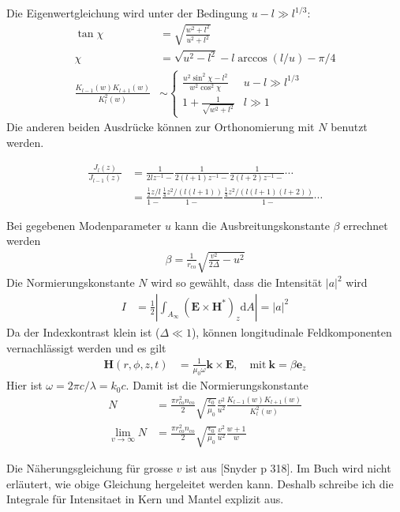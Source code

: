 \documentclass[DIV19,twocolumn]{scrartcl}
\newcommand{\vect}[1]{\mathbf{#1}}
\def\k{\vect k}
\def\e{\vect e}
\def\E{\vect E}
\def\H{\vect H}
\def\({\left(}
\def\){\right)}
\newcommand{\nco}{n_\textrm{co}}
\newcommand{\rco}{r_\textrm{co}}
\begin{document}
Die Eigenwertgleichung wird unter der Bedingung $u-l\gg l^{1/3}$:
\begin{align}
  \tan\chi &= \sqrt{\frac{w^2+l^2}{u^2+l^2}}\\
  \chi &= \sqrt{u^2-l^2}-l\arccos(l/u)-\pi/4\\
  \frac{K_{l-1}(w)K_{l+1}(w)}{K_l^2(w)} &\sim \begin{cases}
    \frac{u^2 \sin^2\chi - l^2}{w^2 \cos^2\chi}&  u-l\gg l^{1/3}\\
   1+\frac{1}{\sqrt{w^2+l^2}} & l\gg 1
\end{cases}
\end{align}
Die anderen beiden Ausdr\"ucke k\"onnen zur Orthonomierung mit $N$
benutzt werden.

\begin{align}
  \frac{J_l(z)}{J_{l-1}(z)} &= \frac{1}{2lz^{-1}-} \frac{1}{2(l+1)z^{-1}-} \frac{1}{2(l+2)z^{-1} -}\cdots \\
  &= \frac{\frac{1}{2}z/l}{1-} \frac{\frac{1}{4}z^2/(l(l+1))}{1-} \frac{\frac{1}{4}z^2/(l(l+1)(l+2))}{1-} \cdots
\end{align}


Bei gegebenen Modenparameter $u$ kann die Ausbreitungskonstante
$\beta$ errechnet werden
\begin{align}
\beta = \frac{1}{\rco} \sqrt{\frac{v^2}{2\Delta} - u^2}
\end{align}
Die Normierungskonstante $N$ wird so gew\"ahlt, dass die Intensit\"at
$|a|^2$ wird
\begin{align}
  I &= \frac{1}{2}\left|\int_{A_\infty}\!\!\!\!\! \(\E\times\H^*\)_z  \textrm{d}A \right| = |a|^2
\end{align}
Da der Indexkontrast klein ist ($\Delta \ll 1$), k\"onnen longitudinale Feldkomponenten vernachl\"assigt werden und es gilt
\begin{align}
  \H(r,\phi,z,t) &= \frac{1}{\mu_0 \omega} \k \times \E, \quad\textrm{mit}\ \k = \beta \e_z
\end{align}
Hier ist $\omega=2\pi c/\lambda=k_0c$.
Damit ist die Normierungskonstante 
\begin{align}
  N &= \frac{\pi \rco^2 \nco}{2} \sqrt{\frac{\epsilon_0}{\mu_0}} \frac{v^2}{u^2} \frac{K_{l-1}(w)K_{l+1}(w)}{K_l^2(w)}\\
  \lim_{v\rightarrow\infty} N &= \frac{\pi \rco^2 \nco}{2} \sqrt{\frac{\epsilon_0}{\mu_0}} \frac{v^2}{u^2} \frac{w+1}{w}
\end{align}

Die N\"aherungsgleichung f\"ur grosse $v$ ist aus [Snyder p 318]. Im
Buch wird nicht erl\"autert, wie obige Gleichung hergeleitet werden
kann. Deshalb schreibe ich die Integrale f\"ur Intensitaet in Kern und
Mantel explizit aus.
\end{document}
